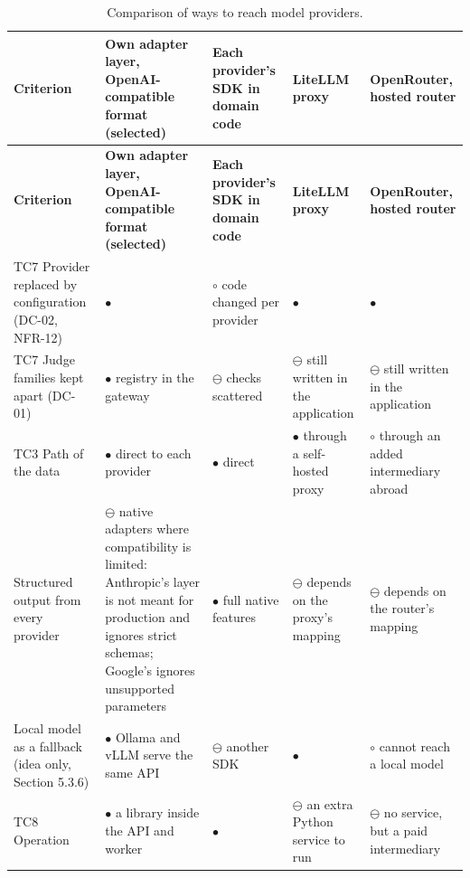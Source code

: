 {\small
\begin{longtable}{|>{\raggedright\arraybackslash}p{}|>{\raggedright\arraybackslash}p{}|>{\raggedright\arraybackslash}p{}|>{\raggedright\arraybackslash}p{}|>{\raggedright\arraybackslash}p{}|}
\caption{Comparison of ways to reach model providers.} \\
\hline
\textbf{Criterion} & \textbf{Own adapter layer, OpenAI-\allowbreak{}compatible format (selected)} & \textbf{Each provider's SDK in domain code} & \textbf{LiteLLM proxy\cite{r191}} & \textbf{OpenRouter, hosted router\cite{r192}} \\ \hline
\endfirsthead
\hline
\textbf{Criterion} & \textbf{Own adapter layer, OpenAI-\allowbreak{}compatible format (selected)} & \textbf{Each provider's SDK in domain code} & \textbf{LiteLLM proxy\cite{r191}} & \textbf{OpenRouter, hosted router\cite{r192}} \\ \hline
\endhead
TC7 Provider replaced by configuration (DC-02, NFR-12) & $\bullet$ & $\circ$ code changed per provider & $\bullet$ & $\bullet$ \\ \hline
TC7 Judge families kept apart (DC-01) & $\bullet$ registry in the gateway & $\ominus$ checks scattered & $\ominus$ still written in the application & $\ominus$ still written in the application \\ \hline
TC3 Path of the data & $\bullet$ direct to each provider & $\bullet$ direct & $\bullet$ through a self-hosted proxy & $\circ$ through an added intermediary abroad \\ \hline
Structured output from every provider & $\ominus$ native adapters where compatibility is limited: Anthropic's layer is not meant for production and ignores strict schemas\cite{r195}; Google's ignores unsupported parameters\cite{r196} & $\bullet$ full native features & $\ominus$ depends on the proxy's mapping & $\ominus$ depends on the router's mapping \\ \hline
Local model as a fallback (idea only, Section 5.3.6) & $\bullet$ Ollama and vLLM serve the same API\cite{r193,r194} & $\ominus$ another SDK & $\bullet$ & $\circ$ cannot reach a local model \\ \hline
TC8 Operation & $\bullet$ a library inside the API and worker & $\bullet$ & $\ominus$ an extra Python service to run & $\ominus$ no service, but a paid intermediary \\ \hline
\end{longtable}
}

